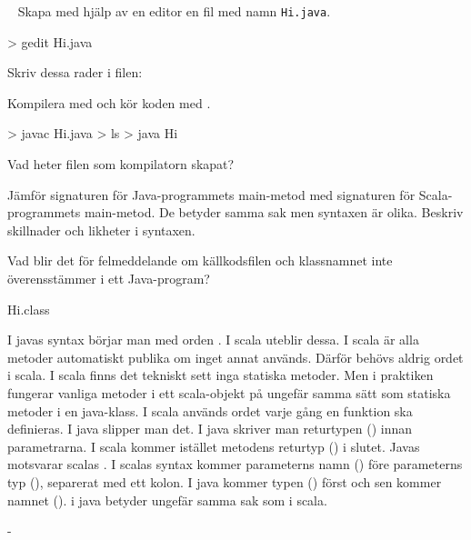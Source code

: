 \QUESTBEGIN

\Task \label{task:java} \what~   Skapa med hjälp av en editor en fil med namn \texttt{Hi.java}.
\begin{REPLnonum}
> gedit Hi.java
\end{REPLnonum}
Skriv dessa rader i filen:


\noindent Kompilera med  och kör koden med .
\begin{REPLnonum}
> javac Hi.java
> ls
> java Hi
\end{REPLnonum}

\Subtask\Pen Vad heter filen som kompilatorn skapat?

\Subtask\Pen Jämför signaturen för Java-programmets main-metod med signaturen för Scala-programmets main-metod. De betyder samma sak men syntaxen är olika. Beskriv skillnader och likheter i syntaxen.

\Subtask\Pen Vad blir det för felmeddelande om källkodsfilen och klassnamnet inte överensstämmer i ett Java-program?


\SOLUTION


\TaskSolved \what
 

\SubtaskSolved  Hi.class

\SubtaskSolved  I javas syntax börjar man med orden . I scala uteblir dessa. I scala är alla metoder automatiskt publika om inget annat används. Därför behövs aldrig ordet  i scala. I scala finns det tekniskt sett inga statiska metoder. Men i praktiken fungerar vanliga metoder i ett scala-objekt på ungefär samma sätt som statiska metoder i en java-klass. I scala används ordet  varje gång en funktion ska definieras. I java slipper man det. I java skriver man returtypen () innan parametrarna. I scala kommer istället metodens returtyp () i slutet. Javas  motsvarar scalas . I scalas syntax kommer parameterns namn () före parameterns typ (), separerat med ett kolon. I java kommer typen () först och sen kommer namnet ().  i java betyder ungefär samma sak som  i scala.

\SubtaskSolved  -



\QUESTEND








